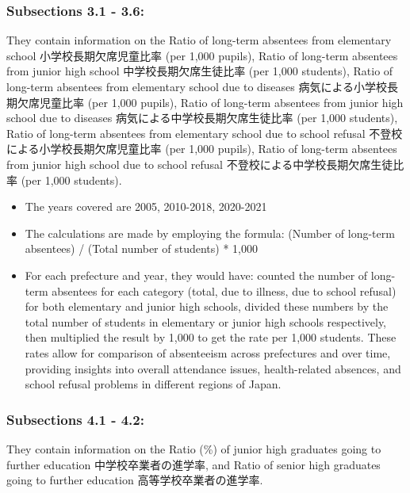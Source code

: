\documentclass[
  12pt,
  letterpaper,
  DIV=11,
  numbers=noendperiod]{scrartcl}
\begin{document}
\hypertarget{subsections-3.1---3.6}{%
\subsubsection{Subsections 3.1 - 3.6:}\label{subsections-3.1---3.6}}

They contain information on the Ratio of long-term absentees from
elementary school 小学校長期欠席児童比率 (per 1,000 pupils), Ratio of
long-term absentees from junior high school 中学校長期欠席生徒比率 (per
1,000 students), Ratio of long-term absentees from elementary school due
to diseases 病気による小学校長期欠席児童比率 (per 1,000 pupils), Ratio
of long-term absentees from junior high school due to diseases
病気による中学校長期欠席生徒比率 (per 1,000 students), Ratio of
long-term absentees from elementary school due to school refusal
不登校による小学校長期欠席児童比率 (per 1,000 pupils), Ratio of
long-term absentees from junior high school due to school refusal
不登校による中学校長期欠席生徒比率 (per 1,000 students).

\begin{itemize}
\item
  The years covered are 2005, 2010-2018, 2020-2021
\item
  The calculations are made by employing the formula: (Number of
  long-term absentees) / (Total number of students) * 1,000
\item
  For each prefecture and year, they would have: counted the number of
  long-term absentees for each category (total, due to illness, due to
  school refusal) for both elementary and junior high schools, divided
  these numbers by the total number of students in elementary or junior
  high schools respectively, then multiplied the result by 1,000 to get
  the rate per 1,000 students. These rates allow for comparison of
  absenteeism across prefectures and over time, providing insights into
  overall attendance issues, health-related absences, and school refusal
  problems in different regions of Japan.
\end{itemize}

\hypertarget{subsections-4.1---4.2}{%
\subsubsection{Subsections 4.1 - 4.2:}\label{subsections-4.1---4.2}}

They contain information on the Ratio (\%) of junior high graduates
going to further education 中学校卒業者の進学率, and Ratio of senior
high graduates going to further education 高等学校卒業者の進学率.
\end{document}
